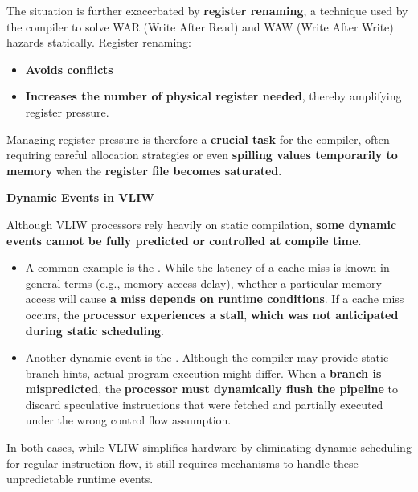 \highspace
The situation is further exacerbated by \textbf{register renaming}, a technique used by the compiler to solve WAR (Write After Read) and WAW (Write After Write) hazards statically. Register renaming:
\begin{itemize}
    \item[\textcolor{Green3}{\faIcon{check}}] \textcolor{Green3}{\textbf{Avoids conflicts}}
    \item[\textcolor{Red2}{\faIcon{times}}] \textcolor{Red2}{\textbf{Increases the number of physical register needed}}, thereby amplifying register pressure.
\end{itemize}

\highspace
Managing register pressure is therefore a \textbf{crucial task} for the compiler, often requiring careful allocation strategies or even \textbf{spilling values temporarily to memory} when the \textbf{register file becomes saturated}.

\newpage

\begin{flushleft}
    \textcolor{Red2}{ \textbf{Dynamic Events in VLIW}}
\end{flushleft}
Although VLIW processors rely heavily on static compilation, \textbf{some dynamic events cannot be fully predicted or controlled at compile time}.
\begin{itemize}
    \item A common example is the . While the latency of a cache miss is known in general terms (e.g., memory access delay), whether a particular memory access will cause \textbf{a miss depends on runtime conditions}. If a cache miss occurs, the \textbf{processor experiences a stall}, \textbf{which was not anticipated during static scheduling}.
    \item Another dynamic event is the . Although the compiler may provide static branch hints, actual program execution might differ. When a \textbf{branch is mispredicted}, the \textbf{processor must dynamically flush the pipeline} to discard speculative instructions that were fetched and partially executed under the wrong control flow assumption.
\end{itemize}
In both cases, while VLIW simplifies hardware by eliminating dynamic scheduling for regular instruction flow, it still requires mechanisms to handle these unpredictable runtime events.

